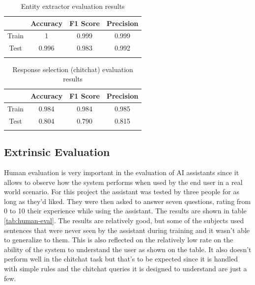 \documentclass[journal, 11pt]{IEEEtran}
\begin{document}
\begin{table}[ht]
    \centering
    \begin{tabular}{@{}cccc@{}}
        \toprule
        \textbf{} & \textbf{Accuracy} & \textbf{F1 Score} & \textbf{Precision} \\ \midrule
        Train     & 1                 & 0.999             & 0.999              \\
        Test      & 0.996             & 0.983             & 0.992              \\ \bottomrule\\
    \end{tabular}
    \caption{Entity extractor evaluation results}
    \label{tab:entity-eval}
\end{table}

\begin{table}[ht]
    \centering
    \begin{tabular}{@{}cccc@{}}
        \toprule
        \textbf{} & \textbf{Accuracy} & \textbf{F1 Score} & \textbf{Precision} \\ \midrule
        Train     & 0.984             & 0.984             & 0.985              \\
        Test      & 0.804             & 0.790             & 0.815              \\ \bottomrule\\
    \end{tabular}
    \caption{Response selection (chitchat) evaluation results}
    \label{tab:chitchat-eval}
\end{table}

\subsection{Extrinsic Evaluation}
Human evaluation is very important in the evaluation of AI assistants since it allows to observe how the system performs when used by the end user in a real world scenario.
For this project the assistant was tested by three people for as long as they'd liked. They were then asked to answer seven questions, rating from 0 to 10 their experience while using the assistant.
The results are shown in table \ref{tab:human-eval}.
The results are relatively good, but some of the subjects used sentences that were never seen by the assistant during training and it wasn't able to generalize to them. This is also reflected on the relatively low rate on the ability of the system to understand the user as shown on the table.
It also doesn't perform well in the chitchat task but that's to be expected since it is handled with simple rules and the chitchat queries it is designed to understand are just a few.
\end{document}
